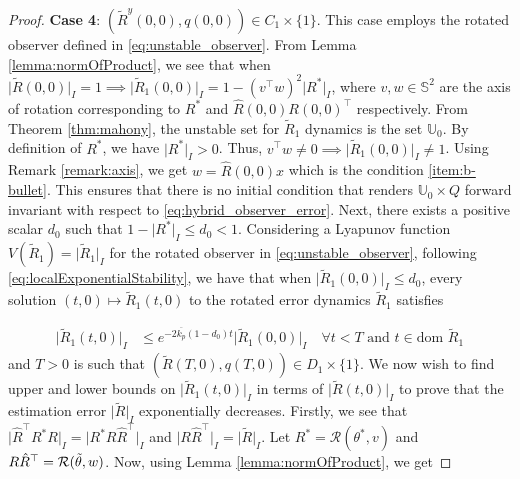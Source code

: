 \documentclass{article}
\newcommand{\dom}{\text{dom }}
\newcommand{\Rtilde}{\tilde{R}}
\newcommand{\normSOthree}[1]{{{\vert}#1 {\vert}_I}}
\newcommand{\expo}[1]{e^{#1}}
\newcommand{\Rstar}{{R^*}}
\begin{document}
\begin{proof}
\textbf{Case 4}: ${(\Rtilde^y(0,0), q(0,0))}\in C_1\times\{1\}$. This case employs the rotated observer defined in \eqref{eq:unstable_observer}. From Lemma \ref{lemma:normOfProduct}, we see that when  $\normSOthree{\Rtilde(0,0)}=1 \implies \normSOthree{\Rtilde_1(0,0)} = 1 - (v^\top w)^2\normSOthree{\Rstar}$, where $v, w\in\mathbb{S}^2$ are the axis of rotation corresponding to $\Rstar$ and $\hat{R}(0,0)R(0,0)^\top $ respectively. From Theorem \ref{thm:mahony}, the unstable set for $\Rtilde_1$ dynamics is the set $\mathbb{U}_0$. By definition of $\Rstar$, we have $\normSOthree{\Rstar} > 0$. Thus, $v^\top w \neq 0 \implies \normSOthree{\Rtilde_1(0,0)} \neq 1$. Using Remark \ref{remark:axis}, we get $w = \hat{R}(0,0)x$ which is the condition \ref{item:b-bullet}. This ensures that there is no initial condition that renders $\mathbb{U}_0\times Q$ forward invariant with respect to \eqref{eq:hybrid_observer_error}. Next, there exists a positive scalar $d_0$ such that $1 - \normSOthree{\Rstar}\leq d_0 < 1$. Considering a Lyapunov function $V(\Rtilde_1) = \normSOthree{\Rtilde_1}$ for the rotated observer in \eqref{eq:unstable_observer}, following \eqref{eq:localExponentialStability}, we have that when $\normSOthree{\Rtilde_1(0,0)} \leq d_0$, every solution $(t,0)\mapsto \Rtilde_1(t,0)$ to the rotated error dynamics $\Rtilde_1$  satisfies

\begin{align}\label{eq:R1tilde_exponentialconvergence}
    \normSOthree{\Rtilde_1(t,0)} &\leq \expo{-2\overline{k_p}(1-d_0)t}\normSOthree{\Rtilde_1(0,0)} \quad \forall t < T \text{ and } t\in \dom \Rtilde_1
\end{align}
and $T > 0$ is such that $(\Rtilde(T,0), q(T,0))\in D_1\times \{1\}$. We now wish to find upper and lower bounds on $\normSOthree{\Rtilde_1(t,0)}$ in terms of $\normSOthree{\Rtilde(t,0)}$ to prove that the estimation error $\normSOthree{\Rtilde}$ exponentially decreases. Firstly, we see that $\normSOthree{\hat{R}^\top \Rstar R} = \normSOthree{\Rstar R\hat{R}^\top }$ and $\normSOthree{R\hat{R}^\top } = \normSOthree{\Rtilde}$. Let $\Rstar = \mathcal{R}(\theta^*, v)$ and $R\hat{R}^\top  = \mathcal{R}(\Tilde{\theta}, w)$. Now, using Lemma \ref{lemma:normOfProduct}, we get 


\end{proof}
\end{document}
